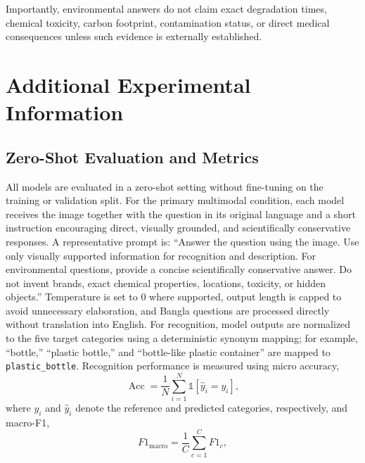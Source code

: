 \documentclass{article}
\begin{document}
Importantly, environmental answers do not claim exact degradation times, chemical toxicity, carbon footprint, contamination status, or direct medical consequences unless such evidence is externally established. 

\section{Additional Experimental Information}
\label{appendix:metrics}
\subsection{Zero-Shot Evaluation and Metrics}

All models are evaluated in a zero-shot setting without fine-tuning on the training or validation split. For the primary multimodal condition, each model receives the image together with the question in its original language and a short instruction encouraging direct, visually grounded, and scientifically conservative responses. A representative prompt is: ``Answer the question using the image. Use only visually supported information for recognition and description. For environmental questions, provide a concise scientifically conservative answer. Do not invent brands, exact chemical properties, locations, toxicity, or hidden objects.'' Temperature is set to 0 where supported, output length is capped to avoid unnecessary elaboration, and Bangla questions are processed directly without translation into English. For recognition, model outputs are normalized to the five target categories using a deterministic synonym mapping; for example, ``bottle,'' ``plastic bottle,'' and ``bottle-like plastic container'' are mapped to \texttt{plastic\_bottle}. Recognition performance is measured using micro accuracy,
\begin{equation}
\operatorname{Acc}
=
\frac{1}{N}
\sum_{i=1}^{N}
\mathbb{1}
\left[
\hat{y}_i = y_i
\right],
\label{eq:accuracy}
\end{equation}
where $y_i$ and $\hat{y}_i$ denote the reference and predicted categories, respectively, and macro-F1,
\begin{equation}
F1_{\mathrm{macro}}
=
\frac{1}{C}
\sum_{c=1}^{C}
F1_c,
\label{eq:macro_f1}
\end{equation}
\end{document}
